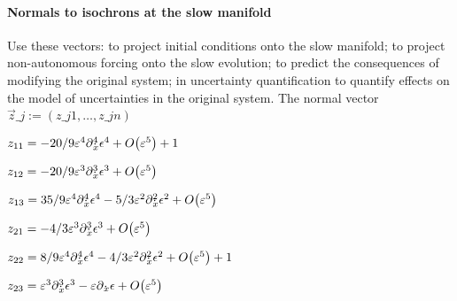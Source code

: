 \documentclass[11pt,a5paper]{article}
\def\diff{\partial\makebox[0pt]{\ $\cdot$}}
\begin{document}
\paragraph{Normals to isochrons at the slow manifold}
Use these vectors: to project initial conditions
onto the slow manifold; to project non-autonomous
forcing onto the slow evolution; to predict the
consequences of modifying the original system; in
uncertainty quantification to quantify effects on
the model of uncertainties in the original system.
The normal vector \(\vec z\_j:=(z\_{j1},\ldots,z\_{jn})\)
\(
\)\par
\(z_{11}=-20/9 \eps^{4} \diff_{x}^{4} \epsilon ^{4}+O\big(\varepsilon ^{5}
\big)+1
\)\par
\(z_{12}=-20/9 \eps^{3} \diff_{x}^{3} \epsilon ^{3}+O\big(\varepsilon ^{5}
\big)
\)\par
\(z_{13}=35/9 \eps^{4} \diff_{x}^{4} \epsilon ^{4}-5/3 \eps^{2} \diff_{x}
^{2} \epsilon ^{2}+O\big(\varepsilon ^{5}\big)
\)\par
\(z_{21}=-4/3 \eps^{3} \diff_{x}^{3} \epsilon ^{3}+O\big(\varepsilon ^{5}
\big)
\)\par
\(z_{22}=8/9 \eps^{4} \diff_{x}^{4} \epsilon ^{4}-4/3 \eps^{2} \diff_{x}^{
2} \epsilon ^{2}+O\big(\varepsilon ^{5}\big)+1
\)\par
\(z_{23}=\eps^{3} \diff_{x}^{3} \epsilon ^{3}-\eps \diff_{x} \epsilon +O
\big(\varepsilon ^{5}\big)
\)\par
\(
\)\par
\end{document}
